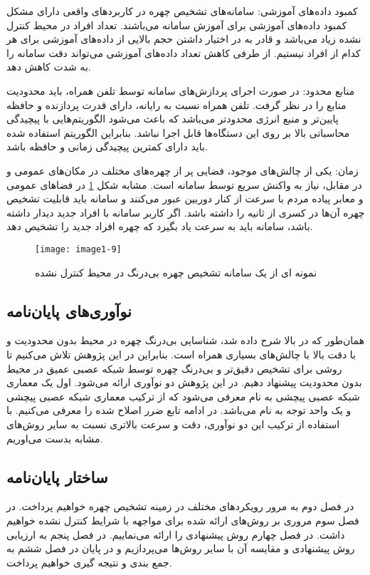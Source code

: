 \noindent
کمبود داده‌های آموزشی: سامانه‌های تشخیص چهره در کاربردهای واقعی دارای مشکل کمبود داده‌های آموزشی برای آموزش سامانه می‌باشند. تعداد افراد در محیط کنترل نشده زیاد می‌باشد و قادر به در اختیار داشتن حجم بالایی از داده‌های آموزشی برای هر کدام از افراد نیستیم. از طرفی کاهش تعداد داده‌های آموزشی می‌تواند دقت سامانه را به شدت کاهش دهد. 

\noindent
منابع محدود: در صورت اجرای پردازش‌های سامانه توسط تلفن همراه، باید محدودیت منابع را در نظر گرفت. تلفن همراه نسبت به رایانه، دارای قدرت پردازنده و حافظه پایین‌تر و منبع انرژی محدودتر می‌باشد که باعث می‌شود الگوریتم‌هایی با پیچیدگی محاسباتی بالا بر روی این دستگاه‌ها قابل اجرا نباشد. بنابراین الگوریتم استفاده شده باید دارای کمترین پیچیدگی زمانی و حافظه باشد.

\noindent
زمان: یکی از چالش‌های موجود، فضایی پر از چهره‌های مختلف در مکان‌های عمومی و در مقابل، نیاز به واکنش سریع توسط سامانه است. مشابه شکل \ref{image1-9} در فضاهای عمومی و معابر پیاده مردم با سرعت از کنار دوربین عبور می‌کنند و سامانه باید قابلیت تشخیص چهره آن‌ها در کسری از ثانیه را داشته باشد. اگر کاربر سامانه با افراد جدید دیدار داشته باشد، سامانه باید به سرعت یاد بگیرد که چهره افراد جدید را تشخیص دهد. 

\begin{figure}[!h]
\centering
\texttt{[image: image1-9]}
\caption{نمونه ای از یک سامانه تشخیص چهره بی‌درنگ در محیط کنترل نشده \cite{CHAUDHRY2017168}}
\label{image1-9}
\end{figure}

\subsection{نوآوری‌های پایان‌نامه}
 همان‌طور که در بالا شرح داده شد، شناسایی بی‌درنگ چهره در محیط بدون محدودیت و با دقت بالا با چالش‌های بسیاری همراه است. بنابراین در این پژوهش تلاش می‌کنیم تا روشی برای تشخیص دقیق‌تر و بی‌درنگ چهره توسط شبکه عصبی عمیق در محیط بدون محدودیت پیشنهاد دهیم. در این پژوهش دو نوآوری ارائه می‌شود. اول یک معماری شبکه عصبی پیچشی به نام  معرفی می‌شود که از ترکیب معماری شبکه عصبی پیچشی  و یک واحد توجه به نام   می‌باشد. در ادامه تابع ضرر  اصلاح شده را معرفی می‌کنیم. با استفاده از ترکیب این دو نوآوری، دقت و سرعت بالاتری نسبت به سایر روش‌های مشابه بدست می‌اوریم.  

\subsection{ساختار پایان‌نامه}
در فصل دوم به مرور رویکردهای مختلف در زمینه تشخیص چهره خواهیم پرداخت. در فصل سوم مروری بر روش‌های ارائه شده برای مواجهه با شرایط کنترل نشده خواهیم داشت. در فصل چهارم روش پیشنهادی را ارائه می‌نماییم. در فصل پنجم به ارزیابی روش پیشنهادی و مقایسه آن با سایر روش‌ها می‌پردازیم و در پایان در فصل ششم به جمع بندی و نتیجه گیری خواهیم پرداخت.